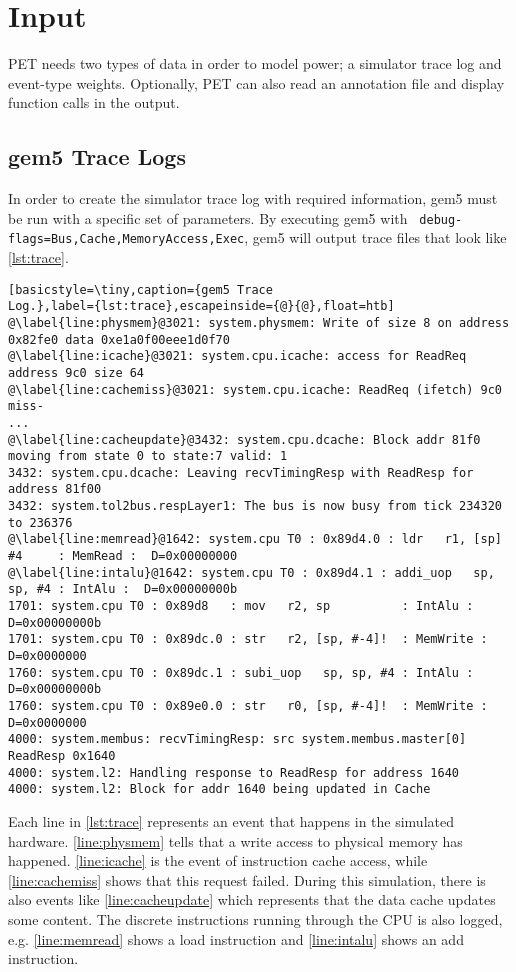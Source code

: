 \section{Input}

PET needs two types of data in order to model power; a simulator trace log and
event-type weights. Optionally, PET can also read an annotation file and display
function calls in the output.

\subsection{gem5 Trace Logs}
In order to create the simulator trace log with required information, gem5 must
be run with a specific set of parameters. By executing gem5 with
\texttt{\textemdash\textemdash
debug-flags=Bus,\allowbreak{}Cache,\allowbreak{}MemoryAccess,\allowbreak{}Exec},
gem5 will output trace files that look like \autoref{lst:trace}.

\begin{lstlisting}[basicstyle=\tiny,caption={gem5 Trace
Log.},label={lst:trace},escapeinside={@}{@},float=htb]
@\label{line:physmem}@3021: system.physmem: Write of size 8 on address 0x82fe0 data 0xe1a0f00eee1d0f70
@\label{line:icache}@3021: system.cpu.icache: access for ReadReq address 9c0 size 64
@\label{line:cachemiss}@3021: system.cpu.icache: ReadReq (ifetch) 9c0 miss-
...
@\label{line:cacheupdate}@3432: system.cpu.dcache: Block addr 81f0 moving from state 0 to state:7 valid: 1
3432: system.cpu.dcache: Leaving recvTimingResp with ReadResp for address 81f00
3432: system.tol2bus.respLayer1: The bus is now busy from tick 234320 to 236376
@\label{line:memread}@1642: system.cpu T0 : 0x89d4.0 : ldr   r1, [sp] #4     : MemRead :  D=0x00000000
@\label{line:intalu}@1642: system.cpu T0 : 0x89d4.1 : addi_uop   sp, sp, #4 : IntAlu :  D=0x00000000b
1701: system.cpu T0 : 0x89d8   : mov   r2, sp          : IntAlu :  D=0x00000000b
1701: system.cpu T0 : 0x89dc.0 : str   r2, [sp, #-4]!  : MemWrite :  D=0x0000000
1760: system.cpu T0 : 0x89dc.1 : subi_uop   sp, sp, #4 : IntAlu :  D=0x00000000b
1760: system.cpu T0 : 0x89e0.0 : str   r0, [sp, #-4]!  : MemWrite :  D=0x0000000
4000: system.membus: recvTimingResp: src system.membus.master[0] ReadResp 0x1640
4000: system.l2: Handling response to ReadResp for address 1640
4000: system.l2: Block for addr 1640 being updated in Cache
\end{lstlisting}

Each line in \autoref{lst:trace} represents an event that happens in the
simulated hardware.  \autoref{line:physmem} tells that a write access to
physical memory has happened. \autoref{line:icache} is the event of instruction
cache access, while \autoref{line:cachemiss} shows that this request failed.
During this simulation, there is also events like \autoref{line:cacheupdate}
which represents that the data cache updates some content. The discrete
instructions running through the CPU is also logged, e.g. \autoref{line:memread}
shows a load instruction and \autoref{line:intalu} shows an add instruction.

